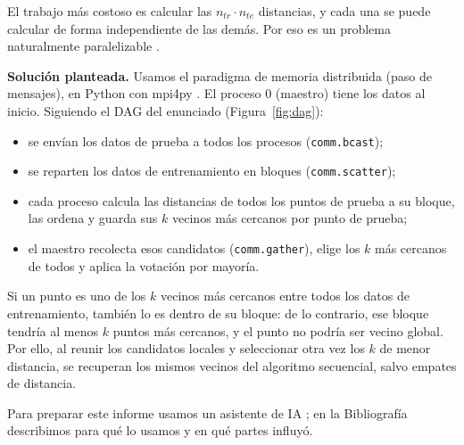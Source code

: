 \documentclass[11pt,a4paper]{article}
\newcommand{\ntr}{n_{tr}}
\newcommand{\nte}{n_{te}}
\begin{document}
El trabajo más costoso es calcular las $\ntr\cdot\nte$ distancias, y cada una se puede calcular de forma independiente de las demás. Por eso es un problema naturalmente paralelizable \cite{slides}.

\textbf{Solución planteada.} Usamos el paradigma de memoria distribuida (paso de mensajes), en Python con mpi4py \cite{mpi4py}. El proceso 0 (maestro) tiene los datos al inicio. Siguiendo el DAG del enunciado \cite{enunciado} (Figura~\ref{fig:dag}):
\begin{itemize}
  \item se envían los datos de prueba a todos los procesos (\texttt{comm.bcast});
  \item se reparten los datos de entrenamiento en bloques (\texttt{comm.scatter});
  \item cada proceso calcula las distancias de todos los puntos de prueba a su bloque, las ordena y guarda sus $k$ vecinos más cercanos por punto de prueba;
  \item el maestro recolecta esos candidatos (\texttt{comm.gather}), elige los $k$ más cercanos de todos y aplica la votación por mayoría.
\end{itemize}

Si un punto es uno de los $k$ vecinos más cercanos entre todos los datos de entrenamiento, también lo es dentro de su bloque: de lo contrario, ese bloque tendría al menos $k$ puntos más cercanos, y el punto no podría ser vecino global. Por ello, al reunir los candidatos locales y seleccionar otra vez los $k$ de menor distancia, se recuperan los mismos vecinos del algoritmo secuencial, salvo empates de distancia.

Para preparar este informe usamos un asistente de IA \cite{ia}; en la Bibliografía describimos para qué lo usamos y en qué partes influyó.
\end{document}
